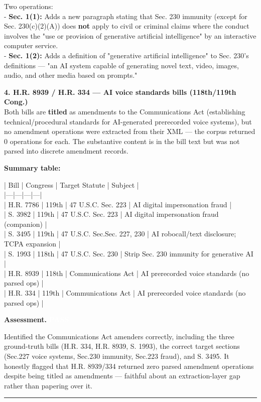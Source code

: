 \documentclass[11pt]{article}
\newcommand{\fieldlabel}[1]{\textbf{\color{navy}#1}\quad}
\begin{document}
Two operations: \\
- \textbf{Sec. 1(1):} Adds a new paragraph stating that Sec. 230 immunity (except for Sec. 230(c)(2)(A)) does \textbf{not} apply to civil or criminal claims where the conduct involves the "use or provision of generative artificial intelligence" by an interactive computer service. \\
- \textbf{Sec. 1(2):} Adds a definition of "generative artificial intelligence" to Sec. 230's definitions --- "an AI system capable of generating novel text, video, images, audio, and other media based on prompts."

\textbf{4. \textbf{H.R. 8939 / H.R. 334 --- AI voice standards bills} (118th/119th Cong.)} \\
Both bills are \textbf{titled} as amendments to the Communications Act (establishing technical/procedural standards for AI-generated prerecorded voice systems), but no amendment operations were extracted from their XML --- the corpus returned 0 operations for each. The substantive content is in the bill text but was not parsed into discrete amendment records.

\textbf{Summary table:}

| Bill | Congress | Target Statute | Subject | \\
|---|---|---|---| \\
| H.R. 7786 | 119th | 47 U.S.C. Sec. 223 | AI digital impersonation fraud | \\
| S. 3982 | 119th | 47 U.S.C. Sec. 223 | AI digital impersonation fraud (companion) | \\
| S. 3495 | 119th | 47 U.S.C. Sec.Sec. 227, 230 | AI robocall/text disclosure; TCPA expansion | \\
| S. 1993 | 118th | 47 U.S.C. Sec. 230 | Strip Sec. 230 immunity for generative AI | \\
| H.R. 8939 | 118th | Communications Act | AI prerecorded voice standards (no parsed ops) | \\
| H.R. 334 | 119th | Communications Act | AI prerecorded voice standards (no parsed ops) |

\fieldlabel{Assessment.} \colorbox{passgreen}{\textcolor{white}{\bfseries PASS}}\par
Identified the Communications Act amenders correctly, including the three ground-truth bills (H.R. 334, H.R. 8939, S. 1993), the correct target sections (Sec.227 voice systems, Sec.230 immunity, Sec.223 fraud), and S. 3495. It honestly flagged that H.R. 8939/334 returned zero parsed amendment operations despite being titled as amendments --- faithful about an extraction-layer gap rather than papering over it.
\vspace{4pt}\hrule\vspace{8pt}
\end{document}

